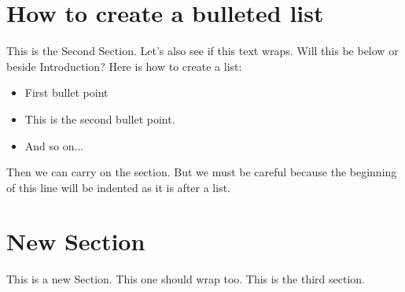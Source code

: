\documentclass{article}
\begin{document}
\begin{multicols}{2}
\section{How to create a bulleted list}
This is the Second Section. Let's also see if this text wraps. Will this be below or beside Introduction? Here is how to create a list:

\begin{itemize}
\item First bullet point
\item This is the second bullet point.
\item And so on...
\end{itemize}

Then we can carry on the section. But we must be careful because the beginning of this line will be indented as it is after a list.

\columnbreak

\section{New Section}
This is a new Section. This one should wrap too. This is the third section.

\end{multicols}

\end{document}

